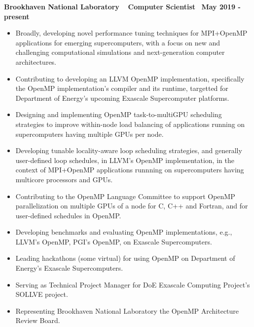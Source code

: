 \textbf{{Brookhaven National Laboratory $\>$$\>$$\>$$\>$Computer Scientist$\>$$\>$$\>$$\>$May 2019 - present}}
\begin{itemize}
\item Broadly, developing novel performance tuning techniques for MPI+OpenMP applications for emerging supercomputers, with a focus on new and challenging computational simulations and next-generation computer architectures.
   \item Contributing to developing an LLVM OpenMP implementation, specifically the OpenMP implementation's compiler and its runtime, targetted for Department of Energy's upcoming Exascale Supercomputer platforms. 
   \item Designing and implementing OpenMP task-to-multiGPU scheduling strategies to improve within-node load balancing of applications running on supercomputers having multiple GPUs per node.
      \item Developing tunable locality-aware loop scheduling strategies, and generally user-defined loop schedules, in LLVM's OpenMP implementation, in the context of MPI+OpenMP applications runnning on supercomputers having multicore processors and GPUs. 
   \item Contributing to the OpenMP Language Committee to support OpenMP parallelization on multiple GPUs of a node for C, C++ and Fortran, and for user-defined schedules in OpenMP.
   \item Developing benchmarks and evaluating OpenMP implementations, e.g., LLVM's OpenMP, PGI's OpenMP, on Exascale Supercomputers.
   \item Leading hackathons (some virtual) for using OpenMP on Department of Energy's Exascale Supercomputers.
   \item Serving as Technical Project Manager for DoE Exascale Computing Project’s SOLLVE project.
   \item Representing Brookhaven National Laboratory the OpenMP Architecture Review Board. 
\end{itemize}

